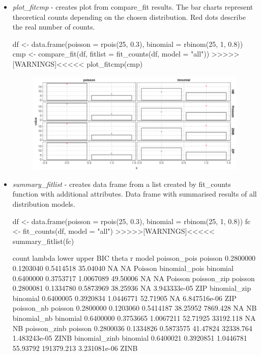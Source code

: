 \begin{itemize}
    \item \textit{plot\_fitcmp} - creates plot from compare\_fit results. The bar charts represent theoretical counts depending on the chosen distribution. Red dots describe the real number of counts.

{\bfseries
\begin{example}
df <- data.frame(poisson = rpois(25, 0.3), binomial = rbinom(25, 1, 0.8))
cmp <- compare_fit(df, fitlist = fit_counts(df, model = "all")) >>>>>[WARNINGS]<<<<<
plot_fitcmp(cmp)
\end{example}
}

\begin{figure}[htbp]
  \centering
  \includegraphics[width=0.99\columnwidth]{Rplot}
  \label{figure:Rplot.png}
\end{figure}

    \item \textit{summary\_fitlist} - creates data frame from a list created by fit\_counts function with additional attributes. Data frame with summarised results of all distribution models.

{\bfseries
\begin{example}
df <- data.frame(poisson = rpois(25, 0.3), binomial = rbinom(25, 1, 0.8))
fc <- fit_counts(df, model = "all") >>>>>[WARNINGS]<<<<<
summary_fitlist(fc) 
\end{example}
}
\scriptsize{
\begin{example}
                 count    lambda     lower     upper      BIC      theta            r   model
poisson_pois   poisson 0.2800000 0.1203040 0.5414518 35.04040         NA           NA Poisson
binomial_pois binomial 0.6400000 0.3753717 1.0067089 49.50006         NA           NA Poisson
poisson_zip    poisson 0.2800081 0.1334780 0.5873969 38.25936         NA 3.943333e-05     ZIP
binomial_zip  binomial 0.6400005 0.3920834 1.0446771 52.71905         NA 6.847516e-06     ZIP
poisson_nb     poisson 0.2800000 0.1203060 0.5414187 38.25952   7869.428           NA      NB
binomial_nb   binomial 0.6400000 0.3753665 1.0067211 52.71925  33192.118           NA      NB
poisson_zinb   poisson 0.2800036 0.1334826 0.5873575 41.47824  32338.764 1.483243e-05    ZINB
binomial_zinb binomial 0.6400021 0.3920851 1.0446781 55.93792 191379.213 3.231081e-06    ZINB
\end{example}
}

\end{itemize}

